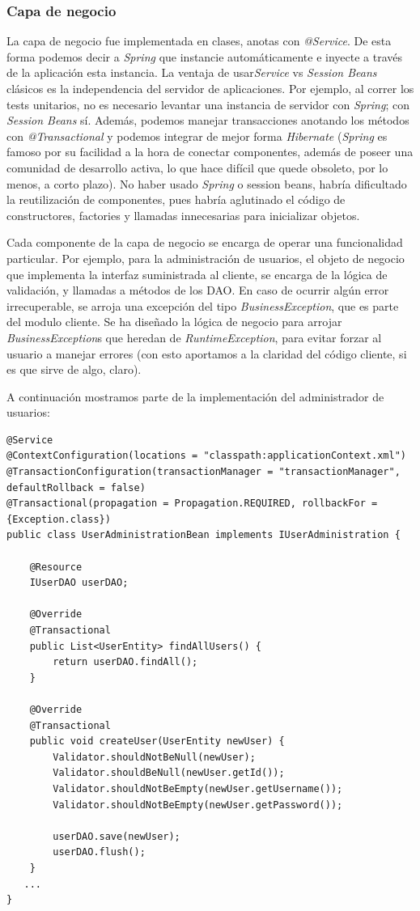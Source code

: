 \documentclass[letter]{article}
\begin{document}
\subsubsection{Capa de negocio}

La capa de negocio fue implementada en clases, anotas con \textit{@Service}. De esta forma podemos decir a \textit{Spring} que instancie automáticamente e inyecte a través de la aplicación esta instancia. La ventaja de usar\textit{Service} vs \textit{Session Beans} clásicos es la independencia del servidor de aplicaciones. Por ejemplo, al correr los tests unitarios, no es necesario levantar una instancia de servidor con \textit{Spring}; con \textit{Session Beans} sí. Además, podemos manejar transacciones anotando los métodos con \textit{@Transactional} y podemos integrar de mejor forma \textit{Hibernate} (\textit{Spring} es famoso por su facilidad a la hora de conectar componentes, además de poseer una comunidad de desarrollo activa, lo que hace difícil que quede obsoleto, por lo menos, a corto plazo). No haber usado \textit{Spring} o session beans, habría dificultado la reutilización de componentes, pues habría aglutinado el código de constructores, factories y llamadas innecesarias para inicializar objetos.

Cada componente de la capa de negocio se encarga de operar una funcionalidad particular. Por ejemplo, para la administración de usuarios, el objeto de negocio que implementa la interfaz suministrada al cliente, se encarga de la lógica de validación, y llamadas a métodos de los DAO. En caso de ocurrir algún error irrecuperable, se arroja una excepción del tipo \textit{BusinessException}, que es parte del modulo cliente. Se ha diseñado la lógica de negocio para arrojar \textit{BusinessException}s que heredan de \textit{RuntimeException}, para evitar forzar al usuario a manejar errores (con esto aportamos a la claridad del código cliente, si es que sirve de algo, claro).

A continuación mostramos parte de la implementación del administrador de usuarios:

\begin{lstlisting}
@Service
@ContextConfiguration(locations = "classpath:applicationContext.xml")
@TransactionConfiguration(transactionManager = "transactionManager", defaultRollback = false)
@Transactional(propagation = Propagation.REQUIRED, rollbackFor = {Exception.class})
public class UserAdministrationBean implements IUserAdministration {

    @Resource
    IUserDAO userDAO;

    @Override
    @Transactional
    public List<UserEntity> findAllUsers() {
        return userDAO.findAll();
    }

    @Override
    @Transactional
    public void createUser(UserEntity newUser) {
        Validator.shouldNotBeNull(newUser);
        Validator.shouldBeNull(newUser.getId());
        Validator.shouldNotBeEmpty(newUser.getUsername());
        Validator.shouldNotBeEmpty(newUser.getPassword());

        userDAO.save(newUser);
        userDAO.flush();
    }
   ...
}
\end{lstlisting}
\end{document}
